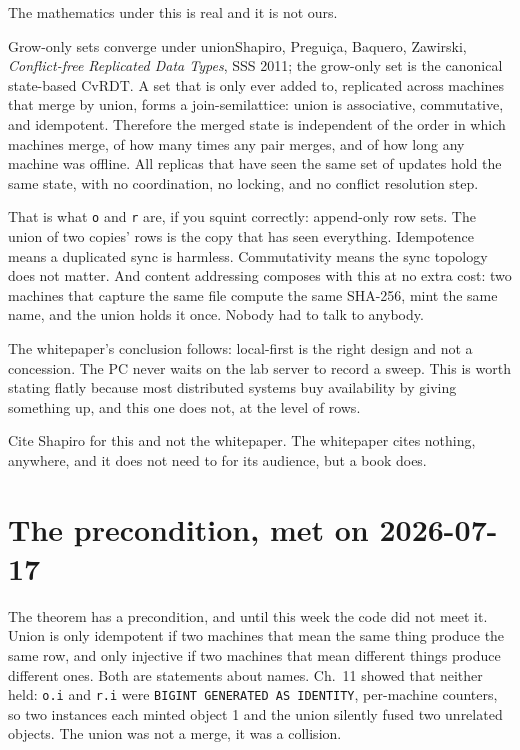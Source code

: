 The mathematics under this is real and it is not ours.

\begin{Theorem}{Grow-only sets converge under union}{Shapiro, Preguiça, Baquero, Zawirski, \emph{Conflict-free Replicated Data Types}, SSS 2011; the grow-only set is the canonical state-based CvRDT.}
A set that is only ever added to, replicated across machines that merge by union, forms a join-semilattice: union is associative, commutative, and idempotent. Therefore the merged state is independent of the order in which machines merge, of how many times any pair merges, and of how long any machine was offline. All replicas that have seen the same set of updates hold the same state, with no coordination, no locking, and no conflict resolution step.
\end{Theorem}

That is what \texttt{o} and \texttt{r} are, if you squint correctly: append-only row sets. The union of two copies' rows is the copy that has seen everything. Idempotence means a duplicated sync is harmless. Commutativity means the sync topology does not matter. And content addressing composes with this at no extra cost: two machines that capture the same \labFileFormat file compute the same SHA-256, mint the same name, and the union holds it once. Nobody had to talk to anybody.

The whitepaper's conclusion follows:  local-first is the right design and not a concession. The \labColdSystemShort PC never waits on the lab server to record a \labRun sweep. This is worth stating flatly because most distributed systems buy availability by giving something up, and this one does not, at the level of rows.

Cite Shapiro for this and not the whitepaper. The whitepaper cites nothing, anywhere, and it does not need to for its audience, but a book does.

\section{The precondition, met on 2026-07-17}

The theorem has a precondition, and until this week the code did not meet it. Union is only idempotent if two machines that mean the same thing produce the same row, and only injective if two machines that mean different things produce different ones. Both are statements about names. Ch.~11 showed that neither held: \texttt{o.i} and \texttt{r.i} were \texttt{BIGINT GENERATED AS IDENTITY}, per-machine counters, so two instances each minted object 1 and the union silently fused two unrelated objects. The union was not a merge, it was a collision.

